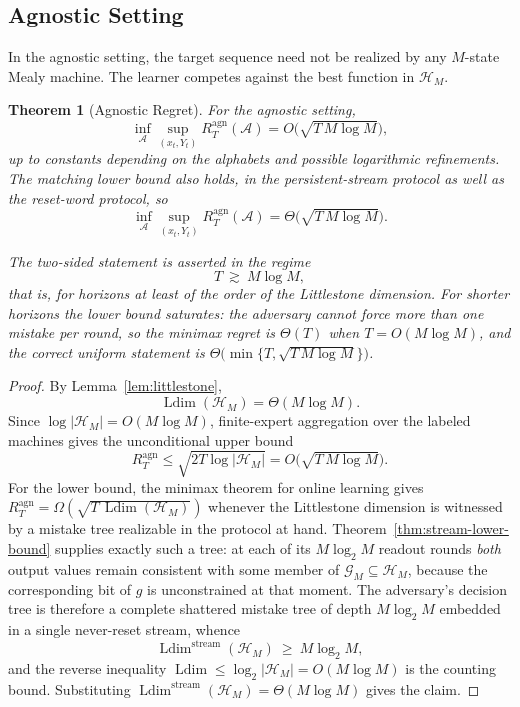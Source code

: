 \documentclass[12pt]{article}
\newtheorem{theorem}{Theorem}[section]
\theoremstyle{definition}
\DeclareMathOperator{\Ldim}{Ldim}
\begin{document}
\subsection{Agnostic Setting}
\label{subsec:agnostic}

In the agnostic setting, the target sequence need not be realized by any
$M$-state Mealy machine.  The learner competes against the best function in
$\mathcal H_M$.

\begin{theorem}[Agnostic Regret]
\label{thm:agnostic}
For the agnostic setting,
\[
\inf_{\mathcal A}
\sup_{(x_t,Y_t)}
R_T^{\mathrm{agn}}(\mathcal A)
=
O\bigl(\sqrt{T\,M\log M}\bigr),
\]
up to constants depending on the alphabets and possible logarithmic
refinements.  The matching lower bound also holds, in the persistent-stream
protocol as well as the reset-word protocol, so
\[
\inf_{\mathcal A}
\sup_{(x_t,Y_t)}
R_T^{\mathrm{agn}}(\mathcal A)
=
\Theta\bigl(\sqrt{T\,M\log M}\bigr).
\]

The two-sided statement is asserted in the regime
\[
T\ \gtrsim\ M\log M ,
\]
that is, for horizons at least of the order of the Littlestone dimension.  For
shorter horizons the lower bound saturates: the adversary cannot force more
than one mistake per round, so the minimax regret is $\Theta(T)$ when
$T=O(M\log M)$, and the correct uniform statement is
$\Theta\bigl(\min\{T,\sqrt{T\,M\log M}\}\bigr)$.
\end{theorem}

\begin{proof}
By Lemma~\ref{lem:littlestone},
\[
\Ldim(\mathcal H_M)=\Theta(M\log M).
\]
Since $\log|\mathcal H_M|=O(M\log M)$, finite-expert aggregation over the
labeled machines gives the unconditional upper bound
\[
R_T^{\mathrm{agn}}
\le
\sqrt{2T\log|\mathcal H_M|}
=
O\bigl(\sqrt{T\,M\log M}\bigr).
\]
For the lower bound, the minimax theorem for online learning
\cite{bendavid2009,daniely2014} gives
$R_T^{\mathrm{agn}}=\Omega(\sqrt{T\,\Ldim(\mathcal H_M)})$ whenever the
Littlestone dimension is witnessed by a mistake tree realizable in the
protocol at hand.  Theorem~\ref{thm:stream-lower-bound} supplies exactly such
a tree: at each of its $M\log_2M$ readout rounds \emph{both} output values
remain consistent with some member of $\mathcal G_M\subseteq\mathcal H_M$,
because the corresponding bit of $g$ is unconstrained at that moment.  The
adversary's decision tree is therefore a complete shattered mistake tree of
depth $M\log_2M$ embedded in a single never-reset stream, whence
\[
\Ldim^{\mathrm{stream}}(\mathcal H_M)\ \ge\ M\log_2M,
\]
and the reverse inequality $\Ldim\le\log_2|\mathcal H_M|=O(M\log M)$ is the
counting bound.  Substituting
$\Ldim^{\mathrm{stream}}(\mathcal H_M)=\Theta(M\log M)$ gives the claim.
\end{proof}
\end{document}
